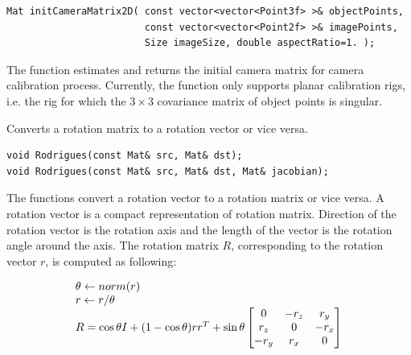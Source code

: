 \begin{lstlisting}
Mat initCameraMatrix2D( const vector<vector<Point3f> >& objectPoints,
                        const vector<vector<Point2f> >& imagePoints,
                        Size imageSize, double aspectRatio=1. );
\end{lstlisting}
\begin{description}
\end{description}

The function estimates and returns the initial camera matrix for camera calibration process.
Currently, the function only supports planar calibration rigs, i.e. the rig for which the $3 \times 3$ covariance matrix of object points is singular.


\label{Rodrigues}
Converts a rotation matrix to a rotation vector or vice versa.

\begin{lstlisting}
void Rodrigues(const Mat& src, Mat& dst);
void Rodrigues(const Mat& src, Mat& dst, Mat& jacobian);
\end{lstlisting}

\begin{description}
\end{description}

The functions convert a rotation vector to a rotation matrix or vice versa. A rotation vector is a compact representation of rotation matrix. Direction of the rotation vector is the rotation axis and the length of the vector is the rotation angle around the axis. The rotation matrix $R$, corresponding to the rotation vector $r$, is computed as following:

\[
\begin{array}{l}
\theta \leftarrow norm(r)\\
r \leftarrow r/\theta\\
R = \cos{\theta} I + (1-\cos{\theta}) r r^T + \sin{\theta}
\begin{bmatrix} 0 & -r_z & r_y\\ r_z & 0 & -r_x\\ -r_y & r_x & 0 \end{bmatrix}
\end{array}
\]


